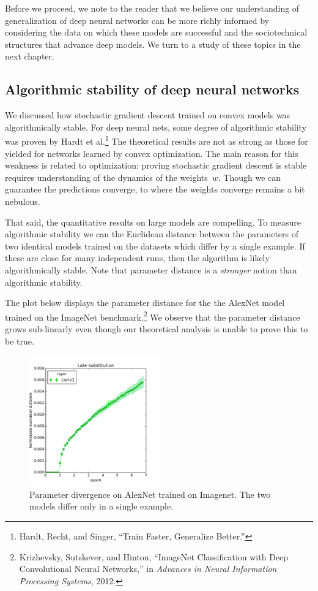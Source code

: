 \documentclass{tufte-book}
\begin{document}
Before we proceed, we note to the reader that we believe our
understanding of generalization of deep neural networks can be more
richly informed by considering the data on which these models are
successful and the sociotechnical structures that advance deep models.
We turn to a study of these topics in the next chapter.

\hypertarget{algorithmic-stability-of-deep-neural-networks}{%
\subsection{Algorithmic stability of deep neural
networks}\label{algorithmic-stability-of-deep-neural-networks}}

We discussed how stochastic gradient descent trained on convex models
was algorithmically stable. For deep neural nets, some degree of
algorithmic stability was proven by Hardt et al.\footnote{Hardt, Recht,
  and Singer, {``Train Faster, Generalize Better.''}} The theoretical
results are not as strong as those for yielded for networks learned by
convex optimization. The main reason for this weakness is related to
optimization: proving stochastic gradient descent is stable requires
understanding of the dynamics of the weights~\(w\). Though we can
guarantee the predictions converge, to where the weights converge
remains a bit nebulous.

That said, the quantitative results on large models are compelling. To
measure algorithmic stability we can the Euclidean distance between the
parameters of two identical models trained on the datasets which differ
by a single example. If these are close for many independent runs, then
the algorithm is likely algorithmically stable. Note that parameter
distance is a \emph{stronger} notion than algorithmic stability.

The plot below displays the parameter distance for the the AlexNet model
trained on the ImageNet benchmark.\footnote{Krizhevsky, Sutskever, and
  Hinton, {``ImageNet Classification with Deep Convolutional Neural
  Networks,''} in \emph{Advances in Neural Information Processing
  Systems}, 2012.} We observe that the parameter distance grows
sub-linearly even though our theoretical analysis is unable to prove
this to be true.

\begin{figure}
\centering
\includegraphics[width=0.5\textwidth,height=\textheight]{assets/imagenet-cpu-late.pdf}
\caption{Parameter divergence on AlexNet trained on Imagenet. The two
models differ only in a single example.}
\end{figure}
\end{document}
